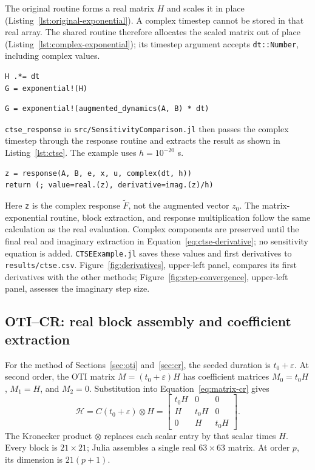 \documentclass[10pt]{article}
\begin{document}
The original routine forms a real matrix $H$ and scales it in place
(Listing~\ref{lst:original-exponential}). A complex timestep cannot be stored in
that real array. The shared routine therefore allocates the scaled matrix out of
place (Listing~\ref{lst:complex-exponential}); its timestep argument accepts
\texttt{dt::Number}, including complex values.
\begin{lstlisting}[caption={Matrix scaling and exponential in the original script.},label={lst:original-exponential}]
H .*= dt
G = exponential!(H)
\end{lstlisting}
\begin{lstlisting}[caption={Replacement in the shared discretization routine.},label={lst:complex-exponential}]
G = exponential!(augmented_dynamics(A, B) * dt)
\end{lstlisting}

\newpage
\texttt{ctse\_response} in \texttt{src/SensitivityComparison.jl} then passes the
complex timestep through the response routine and extracts the result as shown
in Listing~\ref{lst:ctse}. The example uses $h=10^{-20}$ s.
\begin{lstlisting}[caption={CTSE evaluation and extraction; input validation is omitted from this excerpt.},label={lst:ctse}]
z = response(A, B, e, x, u, complex(dt, h))
return (; value=real.(z), derivative=imag.(z)/h)
\end{lstlisting}
Here \texttt{z} is the complex response $\widetilde F$, not the augmented vector
$z_0$. The matrix-exponential routine, block extraction, and response multiplication
follow the same calculation as the real evaluation. Complex components are
preserved until the final real and imaginary extraction in
Equation~\eqref{eq:ctse-derivative}; no sensitivity equation is added.
\texttt{CTSEExample.jl} saves these values and first derivatives to
\texttt{results/ctse.csv}. Figure~\ref{fig:derivatives}, upper-left panel, compares
its first derivatives with the other methods; Figure~\ref{fig:step-convergence},
upper-left panel, assesses the imaginary step size.

\subsection{OTI--CR: real block assembly and coefficient extraction}
\label{sec:oti-thermal}
For the method of Sections~\ref{sec:oti} and~\ref{sec:cr}, the seeded duration is
$t_0+\varepsilon$. At second order, the OTI matrix $M=(t_0+\varepsilon)H$ has
coefficient matrices $M_0=t_0H$, $M_1=H$, and $M_2=0$. Substitution into
Equation~\eqref{eq:matrix-cr} gives
\begin{equation}
\label{eq:lifted-matrix}
 \mathcal H=C(t_0+\varepsilon)\otimes H
 =\begin{bmatrix}t_0H&0&0\\H&t_0H&0\\0&H&t_0H\end{bmatrix}.
\end{equation}
The Kronecker product $\otimes$ replaces each scalar entry by that scalar times
$H$. Every block is $21\times21$; Julia assembles a single real $63\times63$
matrix. At order $p$, its dimension is $21(p+1)$.
\end{document}

